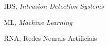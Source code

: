 \begin{siglas}
  \item IDS, \textit{Intrusion Detection Systems}
  \item ML, \textit{Machine Learning}
  \item RNA, Redes Neurais Artificiais
\end{siglas}
